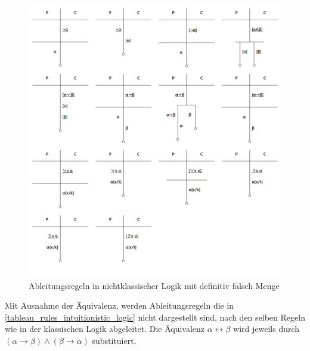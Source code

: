 \begin{figure}[H]
\begin{center}
\includegraphics[scale=0.5]{images/tableau_rules_intuitionistic_logic_2.png}
\caption{Ableitungsregeln in nichtklassischer Logik mit definitiv falsch Menge}
\label{tableau_rules_intuitionistic_logic}
\end{center}
\end{figure}

Mit Ausnahme der Äquivalenz, werden Ableitungsregeln die in \autoref{tableau_rules_intuitionistic_logic} nicht dargestellt sind, nach den selben Regeln wie in der klassischen Logik abgeleitet. Die Äquivalenz $\alpha\leftrightarrow\beta$ wird jeweils durch $(\alpha\rightarrow\beta)\wedge(\beta\rightarrow\alpha)$ substituiert.





